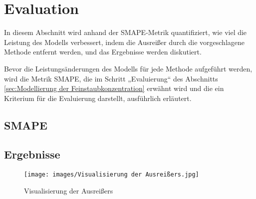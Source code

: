 \chapterpage\chapter{Evaluation}
        In diesem Abschnitt wird anhand der SMAPE-Metrik quantifiziert, wie viel die Leistung des Modells verbessert, indem die Ausreißer durch die vorgeschlagene Methode entfernt werden, und das Ergebnisse werden diskutiert.
        
        Bevor die Leistungsänderungen des Modells für jede Methode aufgeführt werden, wird die Metrik SMAPE, die im Schritt „Evaluierung“ des Abschnitts \ref{sec:Modellierung der Feinstaubkonzentration} erwähnt wird und die ein Kriterium für die Evaluierung darstellt, ausführlich erläutert.
        
        \section*{SMAPE}
        
        \section*{Ergebnisse}

        


        \begin{figure}[h]
            \centering
            \texttt{[image: images/Visualisierung der Ausreißers.jpg]}
            \caption{Visualisierung der Ausreißers}
            \label{fig:Visualisierung der Ausreißers}
        \end{figure}